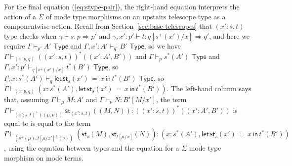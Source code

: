 \documentclass[10pt]{article}
\theoremstyle{definition}
\newcommand{\tcell}{\Rightarrow}
\newcommand{\TYPE}{\,\,\mathsf{Type}}
\newcommand{\telety}[3]{\ensuremath{(#1{:}#2,#3)}}
\newcommand{\sigmacl}[3]{\ensuremath{(#1{:}#2,#3)}}
\newcommand\St[2]{\ensuremath{{#1}^*(#2)}}
\newcommand\StI[2]{\ensuremath{\mathsf{st}_{#1}(#2)}}
\newcommand\StE[4]{\ensuremath{\mathsf{let} \, \StI{#1}{#3} \, = \, {#2} \, \mathsf{in} \, #4}}
\newcommand\TypeTwo[4]{\ensuremath{#1 \vdash #2 :  #3 \tcell #4}}
\newcommand\TrPlus[2]{\ensuremath{{#1}^+(#2)}}
\begin{document}
For the final equation (\ref{eq:stype-pair}), the right-hand
equation interprets the action of a $\Sigma$ of mode type morphisms on
an upstairs telescope type as a componentwise action. Recall from
Section~\ref{sec:base-telescopes} that $\sigmacl{x'}{s}{t}$ type checks when
$\TypeTwo{\gamma}{s}{p}{p'}$ and
$\TypeTwo{\gamma,x':p'}{t}{q[\TrPlus{s}{x'}/x]}{q'}$,
and here we require
$\Gamma \vdash_{p'} A' \TYPE$ and $\Gamma,x':A' \vdash_{q'} B' \TYPE$,
so we have
$\Gamma \vdash_{\sigmacl{x}{p}{q}} \St{(\telety{x'}{s}{t})}{\telety{x'}{A'}{B'}}$
and
$\Gamma \vdash_{p} \St{s}{A'} \TYPE$
and 
$\Gamma,x':p' \vdash_{q[\TrPlus{s}{x'}/x]} \St{t}{B'} \TYPE$, so
$\Gamma,x:\St{s}{A'} \vdash_{q} \StE{s}{x}{x'}{\St{t}{B'}} \TYPE$, so
$\Gamma \vdash_{\sigmacl{x}{p}{q}} \telety{x}{\St{s}{A'}}{\StE{s}{x}{x'}{\St{t}{B'}}}$.
The
left-hand column says that, assuming $\Gamma
\vdash_\mu M : A'$ and $\Gamma \vdash_\nu N : B'[M/x']$, 
the term
$\Gamma \vdash_{\TrPlus{\sigmacl{x'}{s}{t}}{(\mu,\nu)}} \StI{\sigmacl{x'}{s}{t}}{(M, N)} : \St{(\telety{x'}{s}{t})}{\telety{x'}{A'}{B'}}$ is equal to
is equal to the term
$\Gamma \vdash_{(\TrPlus{s}{\mu},\TrPlus{t[\mu/x']}{\nu})} (\StI{s}{M}, \StI{t[\mu/x]}{N}) : \telety{x}{\St{s}{A'}}{\StE{s}{x}{x'}{\St{t}{B'}}}$,
using the equation between types and the equation for a $\Sigma$ mode
type morphism on mode terms.  
\end{document}
